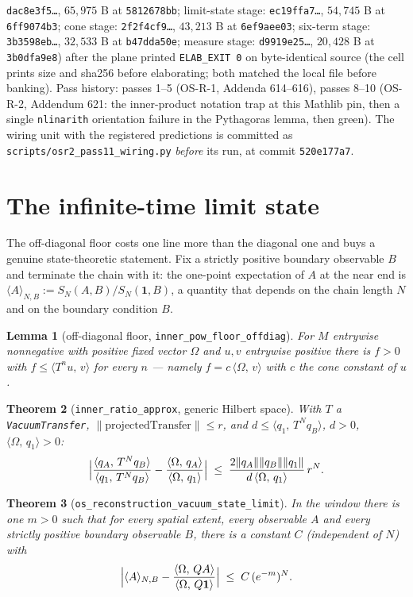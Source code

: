 \documentclass[11pt]{article}
\newtheorem{theorem}{Theorem}[section]
\newtheorem{lemma}[theorem]{Lemma}
\newcommand{\lean}[1]{\texttt{#1}}
\newcommand{\ip}[2]{\langle #1,\,#2\rangle}
\begin{document}
\lean{dac8e3f5\ldots}, $65{,}975$ B at \lean{5812678bb}; limit-state stage:
\lean{ec19ffa7\ldots}, $54{,}745$ B at \lean{6ff9074b3}; cone stage:
\lean{2f2f4cf9\ldots}, $43{,}213$ B at \lean{6ef9aee03}; six-term stage:
\lean{3b3598eb\ldots}, $32{,}533$ B at \lean{b47dda50e}; measure stage:
\lean{d9919e25\ldots}, $20{,}428$ B at \lean{3b0dfa9e8}) after the plane
printed \lean{ELAB\_EXIT 0} on byte-identical source (the cell prints
size and sha256 before elaborating; both matched the local file before
banking).  Pass history: passes 1--5 (OS-R-1, Addenda 614--616),
passes 8--10 (OS-R-2, Addendum 621: the inner-product notation trap at
this Mathlib pin, then a single \lean{nlinarith} orientation failure in
the Pythagoras lemma, then green).  The wiring unit with the registered
predictions is committed as \lean{scripts/osr2\_pass11\_wiring.py}
\emph{before} its run, at commit \lean{520e177a7}.

\section{The infinite-time limit state}\label{sec:state}
The off-diagonal floor costs one line more than the diagonal one and
buys a genuine state-theoretic statement.  Fix a strictly positive
boundary observable $B$ and terminate the chain with it: the one-point
expectation of $A$ at the near end is
$\langle A\rangle_{N,B} := S_N(A,B)/S_N(\mathbf 1,B)$, a quantity that
depends on the chain length $N$ and on the boundary condition $B$.

\begin{lemma}[off-diagonal floor, \lean{inner\_pow\_floor\_offdiag}]
For $M$ entrywise nonnegative with positive fixed vector $\Omega$ and
$u,v$ entrywise positive there is $f>0$ with
$f \le \ip{T^n u}{v}$ for every $n$ --- namely
$f = c\,\ip{\Omega}{v}$ with $c$ the cone constant of $u$.
\end{lemma}

\begin{theorem}[\lean{inner\_ratio\_approx}, generic Hilbert space]
With $T$ a \lean{VacuumTransfer}, $\lVert\mathrm{projectedTransfer}\rVert
\le r$, and $d \le \ip{q_1}{T^N q_B}$, $d>0$, $\ip{\Omega}{q_1}>0$:
\[
\Bigl| \frac{\ip{q_A}{T^N q_B}}{\ip{q_1}{T^N q_B}}
  - \frac{\ip{\Omega}{q_A}}{\ip{\Omega}{q_1}} \Bigr|
\;\le\; \frac{2\lVert q_A\rVert\lVert q_B\rVert\lVert q_1\rVert}
             {d\,\ip{\Omega}{q_1}}\, r^N .
\]
\end{theorem}

\begin{theorem}[\lean{os\_reconstruction\_vacuum\_state\_limit}]
In the window there is \emph{one} $m>0$ such that for \emph{every}
spatial extent, every observable $A$ and every strictly positive
boundary observable $B$, there is a constant $C$ (independent of $N$)
with
\[
\Bigl| \langle A\rangle_{N,B}
  - \frac{\ip{\Omega}{QA}}{\ip{\Omega}{Q\mathbf 1}} \Bigr|
\;\le\; C\,(e^{-m})^N .
\]
\end{theorem}
\end{document}
